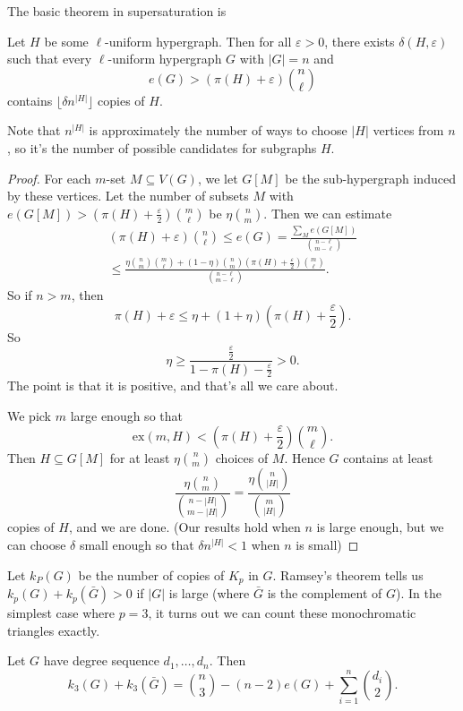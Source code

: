 \documentclass[a4paper]{article}
\renewcommand\ex{\mathrm{ex}}
\begin{document}
The basic theorem in supersaturation is
\begin{thm}
  Let $H$ be some $\ell$-uniform hypergraph. Then for all $\varepsilon > 0$, there exists $\delta(H, \varepsilon)$ such that every $\ell$-uniform hypergraph $G$ with $|G| = n$ and
  \[
    e(G) > (\pi(H) + \varepsilon) \binom{n}{\ell}
  \]
  contains $\lfloor \delta n^{|H|}\rfloor$ copies of $H$.
\end{thm}
Note that $n^{|H|}$ is approximately the number of ways to choose $|H|$ vertices from $n$, so it's the number of possible candidates for subgraphs $H$.

\begin{proof}
  For each $m$-set $M \subseteq V(G)$, we let $G[M]$ be the sub-hypergraph induced by these vertices. Let the number of subsets $M$ with $e(G[M]) > \left(\pi(H) + \frac{\varepsilon}{2}\right) \binom{m}{\ell}$ be $\eta \binom{n}{m}$. Then we can estimate
  \begin{multline*}
    \left(\pi(H) + \varepsilon\right) \binom{n}{\ell} \leq e(G) = \frac{\sum_M e(G[M])}{\binom{n - \ell}{m - \ell}} \\
    \leq \frac{\eta \binom{n}{m} \binom{m}{\ell} + (1 - \eta) \binom{n}{m} \left(\pi(H) + \frac{\varepsilon}{2}\right) \binom{m}{\ell}}{\binom{n - \ell}{m - \ell}}.
  \end{multline*}
  So if $n > m$, then
  \[
    \pi(H) + \varepsilon \leq \eta + (1 + \eta) \left(\pi(H) + \frac{\varepsilon}{2}\right).
  \]
  So
  \[
    \eta \geq \frac{\frac{\varepsilon}{2}}{1 - \pi(H) - \frac{\varepsilon}{2}} > 0.
  \]
  The point is that it is positive, and that's all we care about.

  We pick $m$ large enough so that
  \[
    \ex(m, H) < \left(\pi(H) + \frac{\varepsilon}{2}\right) \binom{m}{\ell}.
  \]
  Then $H \subseteq G[M]$ for at least $\eta \binom{n}{m}$ choices of $M$. Hence $G$ contains at least
  \[
    \frac{\eta\binom{n}{m}}{\binom{n - |H|}{m - |H|}} = \frac{\eta\binom{n}{|H|}}{\binom{m}{|H|}}
  \]
  copies of $H$, and we are done. (Our results hold when $n$ is large enough, but we can choose $\delta$ small enough so that $\delta n^{|H|} < 1$ when $n$ is small)
\end{proof}

Let $k_P(G)$ be the number of copies of $K_p$ in $G$. Ramsey's theorem tells us $k_p(G) + k_p(\bar{G}) > 0$ if $|G|$ is large (where $\bar{G}$ is the complement of $G$). In the simplest case where $p = 3$, it turns out we can count these monochromatic triangles exactly.
\begin{thm}[Lorden, 1961]
  Let $G$ have degree sequence $d_1, \ldots, d_n$. Then
  \[
    k_3(G) + k_3(\bar{G}) = \binom{n}{3} - (n - 2) e(G) + \sum_{i = 1}^n \binom{d_i}{2}.
  \]
\end{thm}
\end{document}
